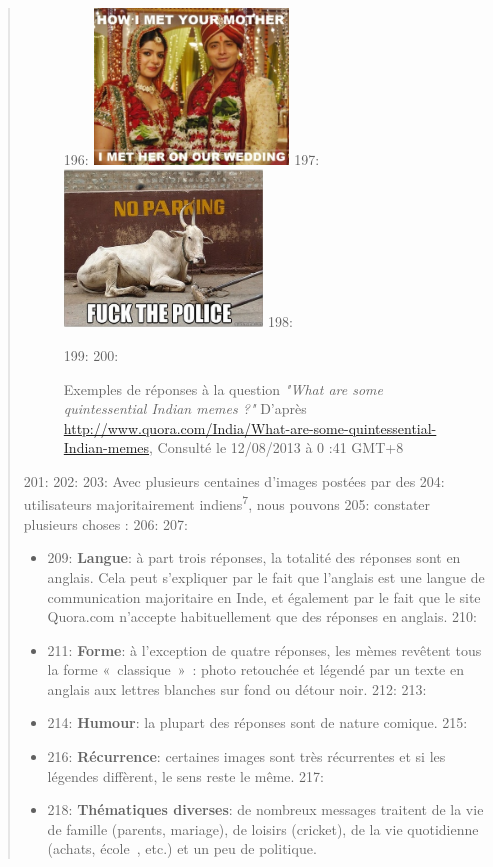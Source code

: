 \begin{quote}
\begin{figure}[h]
196:     \includegraphics[width=2.0449in,height=1.6335in]{figures/chap2/chapitre2-img6.jpg}
197:     \includegraphics[width=2.078in,height=1.6449in]{figures/chap2/chapitre2-img7.jpg}
198:     \caption{Exemples de r\'eponses \`a la question \textit{"What are some quintessential Indian memes ?"} D'apr\`es \url{http://www.quora.com/India/What-are-some-quintessential-Indian-memes}, Consult\'e le 12/08/2013 \`a 0 :41 GMT+8 }
199:     \label{fig:quora-india}
200: \end{figure}
201: 
202: 
203: Avec plusieurs centaines d{\textquoteright}images post\'ees par des
204: utilisateurs majoritairement indiens\textsuperscript{7}, nous pouvons
205: constater plusieurs choses : 
206: 
207: \begin{itemize}
208: \item
209: \textbf{Langue}: à part trois réponses, la totalité des réponses sont en anglais. Cela peut s’expliquer par le fait que l’anglais est une langue de communication majoritaire en Inde, et également par le fait que le site Quora.com n’accepte habituellement que des réponses en anglais.
210: \item
211: \textbf{Forme}: à l’exception de quatre réponses, les mèmes revêtent tous la forme « classique » : photo retouchée et légendé par un texte en anglais aux lettres blanches sur fond ou détour noir.
212: 
213: \item
214: \textbf{Humour}: la plupart des réponses sont de nature comique.
215: \item
216: \textbf{Récurrence}: certaines images sont très récurrentes et si les légendes diffèrent, le sens reste le même.
217: \item
218: \textbf{Thématiques diverses}: de nombreux messages traitent de la vie de famille (parents, mariage), de loisirs (cricket), de la vie quotidienne (achats, école , etc.) et un peu de politique.

\end{itemize}
\end{quote}
